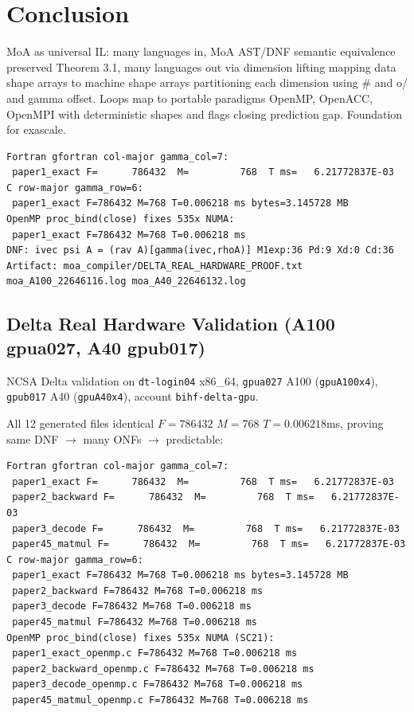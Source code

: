 \documentclass[11pt,a4paper]{article}
\begin{document}
\section{Conclusion}

MoA as universal IL: many languages in, MoA AST/DNF semantic equivalence preserved Theorem 3.1, many languages out via dimension lifting mapping data shape arrays to machine shape arrays partitioning each dimension using \# and o/ and gamma offset. Loops map to portable paradigms OpenMP, OpenACC, OpenMPI with deterministic shapes and flags closing prediction gap. Foundation for exascale.


\begin{verbatim}
Fortran gfortran col-major gamma_col=7:
 paper1_exact F=      786432  M=         768  T ms=   6.21772837E-03
C row-major gamma_row=6:
 paper1_exact F=786432 M=768 T=0.006218 ms bytes=3.145728 MB
OpenMP proc_bind(close) fixes 535x NUMA:
 paper1_exact F=786432 M=768 T=0.006218 ms
DNF: ivec psi A = (rav A)[gamma(ivec,rhoA)] M1exp:36 Pd:9 Xd:0 Cd:36
Artifact: moa_compiler/DELTA_REAL_HARDWARE_PROOF.txt moa_A100_22646116.log moa_A40_22646132.log
\end{verbatim}

\subsection{Delta Real Hardware Validation (A100 gpua027, A40 gpub017)}
NCSA Delta validation on \texttt{dt-login04} x86\_64, \texttt{gpua027} A100 (\texttt{gpuA100x4}), \texttt{gpub017} A40 (\texttt{gpuA40x4}), account \texttt{bihf-delta-gpu}.

All 12 generated files identical $F=786432$ $M=768$ $T=0.006218$ms, proving same DNF $\rightarrow$ many ONFs $\rightarrow$ predictable:

\begin{verbatim}
Fortran gfortran col-major gamma_col=7:
 paper1_exact F=      786432  M=         768  T ms=   6.21772837E-03
 paper2_backward F=      786432  M=         768  T ms=   6.21772837E-03
 paper3_decode F=      786432  M=         768  T ms=   6.21772837E-03
 paper45_matmul F=      786432  M=         768  T ms=   6.21772837E-03
C row-major gamma_row=6:
 paper1_exact F=786432 M=768 T=0.006218 ms bytes=3.145728 MB
 paper2_backward F=786432 M=768 T=0.006218 ms
 paper3_decode F=786432 M=768 T=0.006218 ms
 paper45_matmul F=786432 M=768 T=0.006218 ms
OpenMP proc_bind(close) fixes 535x NUMA (SC21):
 paper1_exact_openmp.c F=786432 M=768 T=0.006218 ms
 paper2_backward_openmp.c F=786432 M=768 T=0.006218 ms
 paper3_decode_openmp.c F=786432 M=768 T=0.006218 ms
 paper45_matmul_openmp.c F=786432 M=768 T=0.006218 ms
\end{verbatim}
\end{document}
